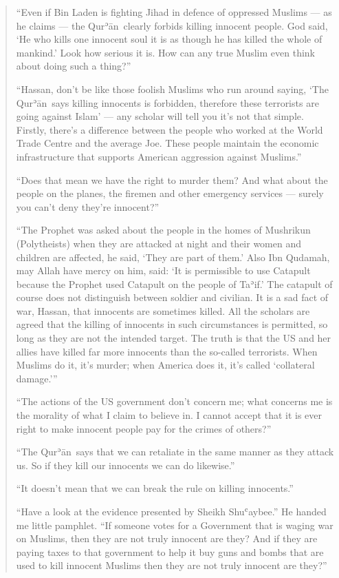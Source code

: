 \documentclass[12pt]{memoir}
\def\´{ʾ} %
\def\`{ʿ} %
\def \Quran{Qur\-\´ān} %
\begin{document}
\begin{quote}
“Even if Bin Laden is fighting Jihad in defence of oppressed Muslims —
as he claims — the \Quran\ clearly forbids killing innocent people.
God said, ‘He who kills one innocent soul it is as though
he has killed the whole of mankind.’ Look how serious it is.
How can any true Muslim even think about doing such a thing?”

“Hassan, don’t be like those foolish Muslims who run around saying,
‘The \Quran\ says killing innocents is forbidden,
therefore these terrorists are going against Islam’ —
any scholar will tell you it’s not that simple.
Firstly, there’s a difference between the people
who worked at the World Trade Centre and the average Joe.
These people maintain the economic infrastructure
that supports American aggression against Muslims.”

“Does that mean we have the right to murder them?
And what about the people on the planes,
the firemen and other emergency services —
surely you can’t deny they’re innocent?”

“The Prophet was asked about the people in the homes of Mushrikun
(Polytheists) when they are attacked at night and their women
and children are affected, he said,
‘They are part of them.’ Also Ibn Qudamah, may Allah have mercy on him, said:
‘It is permissible to use Catapult because the Prophet
used Catapult on the people of Ta\´if.’
The catapult of course does not distinguish between soldier and civilian.
It is a sad fact of war, Hassan, that innocents are sometimes killed.
All the scholars are agreed that the killing of innocents
in such circumstances is permitted,
so long as they are not the intended target.
The truth is that the US and her allies have killed
far more innocents than the so-called terrorists.
When Muslims do it, it’s murder; when America does it,
it’s called ‘collateral damage.’”

“The actions of the US government don’t concern me;
what concerns me is the morality of what I claim to believe in.
I cannot accept that it is ever right to make innocent people pay
for the crimes of others?”

“The \Quran\ says that we can retaliate in the same manner as they attack us.
So if they kill our innocents we can do likewise.”

“It doesn’t mean that we can break the rule on killing innocents.”

“Have a look at the evidence presented by Sheikh Shu\`aybee.”
He handed me little pamphlet.
“If someone votes for a Government that is waging war on Muslims,
then they are not truly innocent are they?
And if they are paying taxes to that government to help it
buy guns and bombs that are used to kill innocent Muslims
then they are not truly innocent are they?”


\end{quote}
\end{document}
